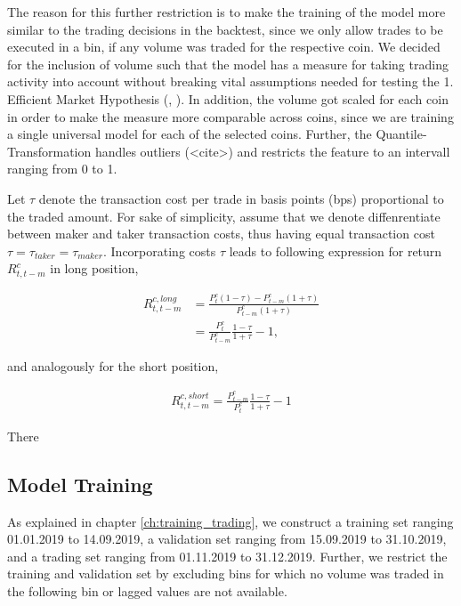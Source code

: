 The reason for this further restriction is to make the training of the model more similar to the 
trading decisions in the backtest, since we only allow trades to be executed in a bin, 
if any volume was traded for the respective coin.
We decided for the inclusion of volume such that the model has a measure for 
taking trading activity into account without breaking vital assumptions needed for testing 
the 1. Efficient Market Hypothesis (\cite{malkiel2003marketHypothesis}, \cite{fama1970marketHypothesis}).
In addition, the volume got scaled for each coin in order to make the measure more comparable across coins,
since we are training a single universal model for each of the selected coins. 
Further, the Quantile-Transformation handles outliers (<cite>) and restricts the feature to an intervall ranging from 0 to 1.

Let $ \tau $ denote the transaction cost per trade in basis points (bps) proportional to the traded amount.
For sake of simplicity, assume that we denote diffenrentiate between maker and taker transaction costs,
thus having equal transaction cost $ \tau = \tau_{taker} = \tau_{maker} $.
Incorporating costs $\tau$ leads to following expression for return $ R_{t, t-m}^{c} $ in long position,

\begin{equation} \label{eq:return_transaction_cost_long}
\begin{aligned}
    R_{t, t-m}^{c, long} &= \frac{ P_{t}^{c}(1 - \tau) - P_{t - m}^{c}(1 + \tau) }{ P_{t - m}^{c}(1 + \tau) }\\
    &= \frac{ P_{t}^{c} }{ P_{t - m}^{c} } \frac{ 1 - \tau }{ 1 + \tau } - 1,
\end{aligned}
\end{equation}

and analogously for the short position,

\begin{equation} \label{eq:return_transaction_cost_short}
    \begin{aligned}
        R_{t, t-m}^{c, short} = \frac{ P_{t - m}^{c} }{ P_{t}^{c} } \frac{ 1 - \tau }{ 1 + \tau } - 1
    \end{aligned}
\end{equation}

There


\subsection{Model Training}
As explained in chapter \ref{ch:training_trading}, we construct a training set ranging 01.01.2019 to 14.09.2019, 
a validation set ranging from 15.09.2019 to 31.10.2019, and a trading set ranging from 01.11.2019 to 31.12.2019.
Further, we restrict the training and validation set by excluding bins for which no volume 
was traded in the following bin or lagged values are not available.


